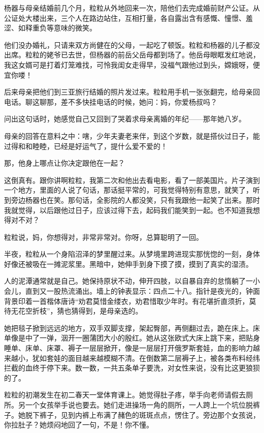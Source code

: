 \documentclass[lang=cn,newtx,12pt,scheme=chinese]{elegantbook}
\begin{document}
杨器与母亲结婚前几个月，粒粒从外地回来一次，陪他们去完成婚前财产公证。从公证处大楼出来，三个人在路边站住，互相打量，各自露出含有感慨、憧憬、羞涩、如释重负等意味的微笑。

他们没办婚礼，只请来双方尚健在的父母，一起吃了顿饭。粒粒和杨器的儿子都没出席。粒粒的姥爷已去世，但杨器的前岳父岳母都到场了。他岳母眼眶发红地说，我这女婿可是打着灯笼难找，可怜我闺女走得早，没福气跟他过到头，嫦娥呀，便宜你喽！

后来母亲把他们到三亚旅行结婚的照片发过来。粒粒用手机一张张翻完，给母亲回电话。聊这聊那，差不多快挂电话的时候，她问：妈，你爱杨叔吗？

问出这句话时，她感觉自己又回到了哭着求母亲离婚的年纪——那年她八岁。

母亲的回答在意料之中：嗐，少年夫妻老来伴，到这个岁数，就是搭伙过日子，能过得和和睦睦，已经是好运气了，提什么爱不爱的！

那，他身上哪点让你决定跟他在一起？

这倒真有。跟你讲啊粒粒，我第二次和他出去看电影，看了一部美国片。片子演到一个地方，里面的人说了句话，那话挺平常的，可我觉得特别有意思，就笑了，听到旁边杨器也在笑。那句话，全影院的人都没笑，只有我跟他一起笑了出来。那时我就觉得，以后跟他过日子，应该过得下去，起码我们能笑到一起。也不知道我想得对不对？

粒粒说，妈，你想得对，非常非常对。你呀，总算聪明了一回。

半夜，粒粒从一个身陷沼泽的梦里醒过来。从梦境里跨进现实那恍惚的一刻，身体好像还被吸在一摊泥浆里。黑暗中，她伸手到身下摸了摸，摸到了真实的湿渍。

人的泥潭通常就是自己。她保持原状不动，伸开四肢，以自暴自弃的怠惰躺了一小会儿，直到又一股热流涌出。墙上的钟表显示：四点二十八。指针是夜光的，钟面背景印着一首楷体唐诗“劝君莫惜金缕衣，劝君惜取少年时。有花堪折直须折，莫待无花空折枝”，猜也猜得到，是母亲选的。

她把毯子掀到远远的地方，双手双脚支撑，架起臀部，再侧翻过去，跪在床上。床单像是中了一弹，洇开一圈蒲团大小的殷红。她从这张欧式大床上跳下来，把贴身睡单、床单、床罩、褥子一层层掀开，像是一层层打开俄罗斯套娃，血的影响力越来越小，犹如套娃的面目越来越模糊不清。在倒数第二层褥子上，被各类布料经纬拦截的血终于停下来。数一数，一共五条单子要洗，对女性来说，没有比这更狼狈的了。

粒粒的初潮发生在初二春天一堂体育课上。她觉得肚子疼，举手向老师请假去厕所。另一个女孩举手说也要去。她们走进操场一角的厕所，一人跨上一个坑位脱裤子。她脱下裤子，见到内裤上布满了赭色的斑斑点点，愣住了。旁边那个女孩说，你拉肚子？她烦闷地回了一句，不是！你不懂。
\end{document}

